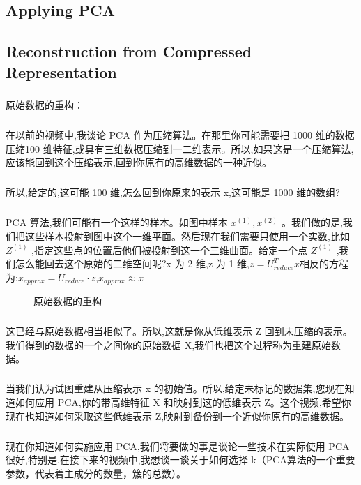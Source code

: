 \documentclass{article}
\begin{document}
\begin{CJK}{UTF8}{gbsn}
\section{Applying PCA}
\subsection{Reconstruction from Compressed Representation}
\subparagraph{}
原始数据的重构：
\subparagraph{}
在以前的视频中,我谈论 PCA 作为压缩算法。在那里你可能需要把 1000 维的数据压缩100 维特征,或具有三维数据压缩到一二维表示。所以,如果这是一个压缩算法,应该能回到这个压缩表示,回到你原有的高维数据的一种近似。
\subparagraph{}
所以,给定的,这可能 100 维,怎么回到你原来的表示 x,这可能是 1000 维的数组?
\subparagraph{}
PCA 算法,我们可能有一个这样的样本。如图中样本 $x^{(1)},x^{(2)}$ 。我们做的是,我们把这些样本投射到图中这个一维平面。然后现在我们需要只使用一个实数,比如 $Z^{(1)}$ ,指定这些点的位置后他们被投射到这一个三维曲面。给定一个点 $Z^{(1)}$ ,我们怎么能回去这个原始的二维空间呢?x 为 2 维,z 为 1 维,$z=U_{reduce}^Tx$相反的方程为:$x_{approx}=U_{reduce}\cdot{z}$,$x_{approx}\approx{x}$
\begin{figure}[H]
\label{fig:853}
\caption{原始数据的重构}
\end{figure}
\begin{figure}[H]
\label{fig:854}
\end{figure}
\begin{figure}[H]
\label{fig:855}
\end{figure}
\subparagraph{}
这已经与原始数据相当相似了。所以,这就是你从低维表示 Z 回到未压缩的表示。我们得到的数据的一个之间你的原始数据 X,我们也把这个过程称为重建原始数据。
\subparagraph{}
当我们认为试图重建从压缩表示 x 的初始值。所以,给定未标记的数据集,您现在知道如何应用 PCA,你的带高维特征 X 和映射到这的低维表示 Z。这个视频,希望你现在也知道如何采取这些低维表示 Z,映射到备份到一个近似你原有的高维数据。
\subparagraph{}
现在你知道如何实施应用 PCA,我们将要做的事是谈论一些技术在实际使用 PCA 很好,特别是,在接下来的视频中,我想谈一谈关于如何选择 k（PCA算法的一个重要参数，代表着主成分的数量，簇的总数）。

\end{CJK}
\end{document}
